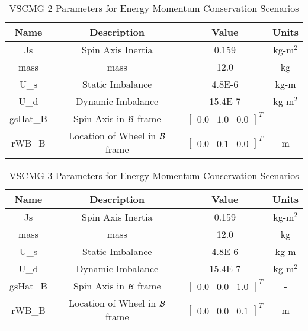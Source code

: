 \begin{table}[htbp]
	\caption{VSCMG 2 Parameters for Energy Momentum Conservation Scenarios}
	\label{tab:rw2}
	\centering \fontsize{10}{10}\selectfont
	\begin{tabular}{ c | c | c | c } %
		\hline
		\textbf{Name}  & \textbf{Description}  & \textbf{Value} & \textbf{Units} \\
		\hline
		Js  & Spin Axis Inertia & 0.159 & kg-m$^2$ \\
		mass & mass & 12.0 & kg \\
		U\_s & Static Imbalance & 4.8E-6 & kg-m \\
		U\_d & Dynamic Imbalance & 15.4E-7 & kg-m$^2$ \\
		gsHat\_B & Spin Axis in $\cal{B}$ frame & $\begin{bmatrix}
		0.0 & 1.0 & 0.0 \end{bmatrix}^T$ & - \\
		rWB\_B & Location of Wheel in $\cal{B}$ frame & $\begin{bmatrix}
		0.0 & 0.1 & 0.0 \end{bmatrix}^T$ & m \\
		\hline
	\end{tabular}
\end{table}

\begin{table}[htbp]
	\caption{VSCMG 3 Parameters for Energy Momentum Conservation Scenarios}
	\label{tab:rw3}
	\centering \fontsize{10}{10}\selectfont
	\begin{tabular}{ c | c | c | c } %
		\hline
		\textbf{Name}  & \textbf{Description}  & \textbf{Value} & \textbf{Units} \\
		\hline
		Js  & Spin Axis Inertia & 0.159 & kg-m$^2$ \\
		mass & mass & 12.0 & kg \\
		U\_s & Static Imbalance & 4.8E-6 & kg-m \\
		U\_d & Dynamic Imbalance & 15.4E-7 & kg-m$^2$ \\
		gsHat\_B & Spin Axis in $\cal{B}$ frame & $\begin{bmatrix}
		0.0 & 0.0 & 1.0 \end{bmatrix}^T$ & - \\
		rWB\_B & Location of Wheel in $\cal{B}$ frame & $\begin{bmatrix}
		0.0 & 0.0 & 0.1 \end{bmatrix}^T$ & m \\
		\hline
	\end{tabular}
\end{table}

